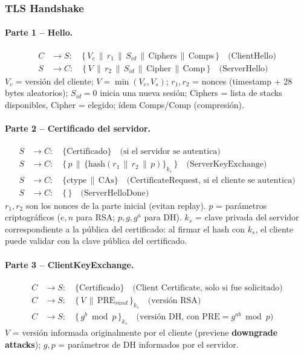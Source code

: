 \documentclass[../main.tex]{subfiles}
\begin{document}
\subsubsection{TLS Handshake}

\paragraph{Parte 1 -- Hello.}
\begin{align*}
C &\to S: \quad \{\, V_c \,\|\, r_1 \,\|\, S_{id} \,\|\, \text{Ciphers} \,\|\, \text{Comps}\,\} \quad \text{(ClientHello)}\\
S &\to C: \quad \{\, V \,\|\, r_2 \,\|\, S_{id} \,\|\, \text{Cipher} \,\|\, \text{Comp}\,\} \quad \text{(ServerHello)}
\end{align*}
$V_c$ = versión del cliente; $V = \min(V_c, V_s)$; $r_1, r_2$ = nonces (timestamp +
28 bytes aleatorios); $S_{id}=0$ inicia una nueva sesión; Ciphers = lista de stacks
disponibles, Cipher = elegido; ídem Comps/Comp (compresión).

\paragraph{Parte 2 -- Certificado del servidor.}
\begin{align*}
S &\to C: \quad \{\text{Certificado}\} \quad \text{(si el servidor se autentica)}\\
S &\to C: \quad \{\, p \,\|\, \{\mathrm{hash}(r_1 \,\|\, r_2 \,\|\, p)\}_{k_s}\,\} \quad \text{(ServerKeyExchange)}\\
S &\to C: \quad \{\text{ctype} \,\|\, \text{CAs}\} \quad \text{(CertificateRequest, si el cliente se autentica)}\\
S &\to C: \quad \{\,\} \quad \text{(ServerHelloDone)}
\end{align*}
$r_1, r_2$ son los nonces de la parte inicial (evitan replay). $p$ = parámetros
criptográficos ($e,n$ para RSA; $p,g,g^a$ para DH). $k_s$ = clave privada del servidor
correspondiente a la pública del certificado: al firmar el hash con $k_s$, el cliente
puede validar con la clave pública del certificado.

\paragraph{Parte 3 -- ClientKeyExchange.}
\begin{align*}
C &\to S: \quad \{\text{Certificado}\} \quad \text{(Client Certificate, solo si fue solicitado)}\\
C &\to S: \quad \{\, V \,\|\, \mathrm{PRE}_{rand}\,\}_{k_s} \quad \text{(versión RSA)}\\
C &\to S: \quad \{\, g^b \bmod p\,\}_{k_s} \quad \text{(versión DH, con } \mathrm{PRE}=g^{ab}\bmod p)
\end{align*}
$V$ = versión informada originalmente por el cliente (previene \textbf{downgrade
attacks}); $g,p$ = parámetros de DH informados por el servidor.
\end{document}
